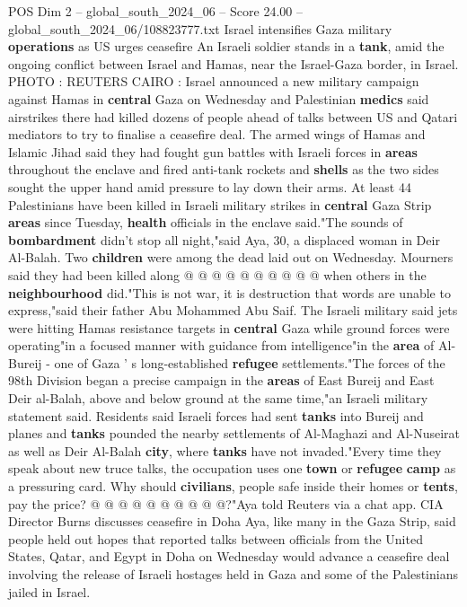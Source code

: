 \begin{textsample}{POS Dim 2 – global\_south\_2024\_06 – Score 24.00 – global\_south\_2024\_06/108823777.txt}  \label{ex:f2_pos_060}
Israel intensifies Gaza military \textbf{operations} as US urges ceasefire An Israeli soldier stands in a \textbf{tank}, amid the ongoing conflict between Israel and Hamas, near the Israel-Gaza border, in Israel.
PHOTO : REUTERS CAIRO : Israel announced a new military campaign against Hamas in \textbf{central} Gaza on Wednesday and Palestinian \textbf{medics} said airstrikes there had killed dozens of people ahead of talks between US and Qatari mediators to try to finalise a ceasefire deal.
The armed wings of Hamas and Islamic Jihad said they had fought gun battles with Israeli forces in \textbf{areas} throughout the enclave and fired anti-tank rockets and \textbf{shells} as the two sides sought the upper hand amid pressure to lay down their arms.
At least 44 Palestinians have been killed in Israeli military strikes in \textbf{central} Gaza Strip \textbf{areas} since Tuesday, \textbf{health} officials in the enclave said."The sounds of \textbf{bombardment} didn't stop all night,"said Aya, 30, a displaced woman in Deir Al-Balah.
Two \textbf{children} were among the dead laid out on Wednesday.
Mourners said they had been killed along @ @ @ @ @ @ @ @ @ @ when others in the \textbf{neighbourhood} did."This is not war, it is destruction that words are unable to express,"said their father Abu Mohammed Abu Saif.
The Israeli military said jets were hitting Hamas resistance targets in \textbf{central} Gaza while ground forces were operating"in a focused manner with guidance from intelligence"in the \textbf{area} of Al-Bureij - one of Gaza ' s long-established \textbf{refugee} settlements."The forces of the 98th Division began a precise campaign in the \textbf{areas} of East Bureij and East Deir al-Balah, above and below ground at the same time,"an Israeli military statement said.
Residents said Israeli forces had sent \textbf{tanks} into Bureij and planes and \textbf{tanks} pounded the nearby settlements of Al-Maghazi and Al-Nuseirat as well as Deir Al-Balah \textbf{city}, where \textbf{tanks} have not invaded."Every time they speak about new truce talks, the occupation uses one \textbf{town} or \textbf{refugee} \textbf{camp} as a pressuring card.
Why should \textbf{civilians}, people safe inside their homes or \textbf{tents}, pay the price? @ @ @ @ @ @ @ @ @ @?"Aya told Reuters via a chat app.
CIA Director Burns discusses ceasefire in Doha Aya, like many in the Gaza Strip, said people held out hopes that reported talks between officials from the United States, Qatar, and Egypt in Doha on Wednesday would advance a ceasefire deal involving the release of Israeli hostages held in Gaza and some of the Palestinians jailed in Israel.

\end{textsample}
